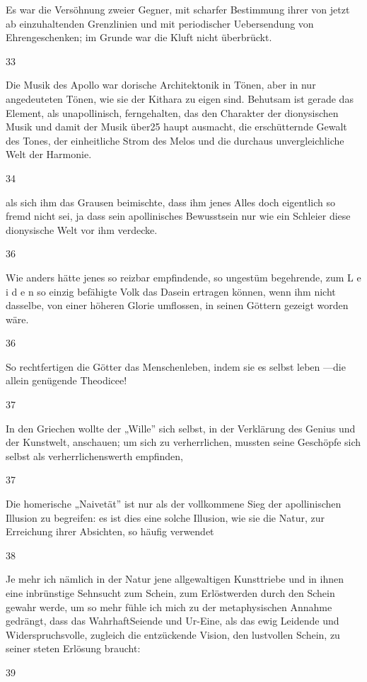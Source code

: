 \documentclass[
  letterpaper,
  DIV=11,
  numbers=noendperiod]{scrartcl}
\begin{document}
Es war die Versöhnung zweier Gegner, mit scharfer Bestimmung ihrer von
jetzt ab einzuhaltenden Grenzlinien und mit periodischer Uebersendung
von Ehrengeschenken; im Grunde war die Kluft nicht überbrückt.

33

Die Musik des Apollo war dorische Architektonik in Tönen, aber in nur
angedeuteten Tönen, wie sie der Kithara zu eigen sind. Behutsam ist
gerade das Element, als unapollinisch, ferngehalten, das den Charakter
der dionysischen Musik und damit der Musik über25 haupt ausmacht, die
erschütternde Gewalt des Tones, der einheitliche Strom des Melos und die
durchaus unvergleichliche Welt der Harmonie.

34

als sich ihm das Grausen beimischte, dass ihm jenes Alles doch
eigentlich so fremd nicht sei, ja dass sein apollinisches Bewusstsein
nur wie ein Schleier diese dionysische Welt vor ihm verdecke.

36

Wie anders hätte jenes so reizbar empfindende, so ungestüm begehrende,
zum L e i d e n so einzig befähigte Volk das Dasein ertragen können,
wenn ihm nicht dasselbe, von einer höheren Glorie umflossen, in seinen
Göttern gezeigt worden wäre.

36

So rechtfertigen die Götter das Menschenleben, indem sie es selbst leben
---die allein genügende Theodicee!

37

In den Griechen wollte der „Wille'' sich selbst, in der Verklärung des
Genius und der Kunstwelt, anschauen; um sich zu verherrlichen, mussten
seine Geschöpfe sich selbst als verherrlichenswerth empfinden,

37

Die homerische „Naivetät'' ist nur als der vollkommene Sieg der
apollinischen Illusion zu begreifen: es ist dies eine solche Illusion,
wie sie die Natur, zur Erreichung ihrer Absichten, so häufig verwendet

38

Je mehr ich nämlich in der Natur jene allgewaltigen Kunsttriebe und in
ihnen eine inbrünstige Sehnsucht zum Schein, zum Erlöstwerden durch den
Schein gewahr werde, um so mehr fühle ich mich zu der metaphysischen
Annahme gedrängt, dass das WahrhaftSeiende und Ur-Eine, als das ewig
Leidende und Widerspruchsvolle, zugleich die entzückende Vision, den
lustvollen Schein, zu seiner steten Erlösung braucht:

39
\end{document}
